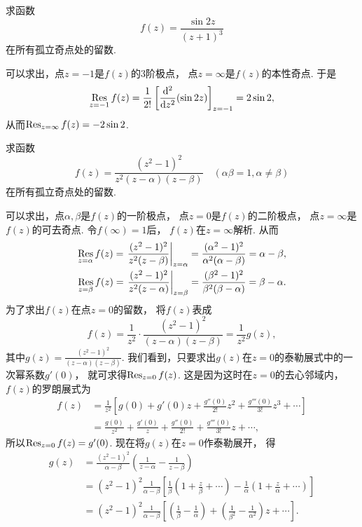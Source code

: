 \begin{example}
求函数\begin{equation*}
	f(z) = \frac{\sin 2z}{(z+1)^3}
\end{equation*}在所有孤立奇点处的留数.
\begin{solution}
可以求出，点\(z=-1\)是\(f(z)\)的3阶极点，
点\(z=\infty\)是\(f(z)\)的本性奇点.
于是\begin{equation*}
	\operatorname*{Res}_{z=-1} f(z)
	= \frac{1}{2!} \left[ \dv[2]{z}(\sin 2z) \right]_{z=-1}
	= 2 \sin 2,
\end{equation*}
从而\(\operatorname*{Res}_{z=\infty} f(z) = -2 \sin 2\).
\end{solution}
\end{example}

\begin{example}
求函数\begin{equation*}
	f(z) = \frac{(z^2-1)^2}{z^2(z-\alpha)(z-\beta)}
	\quad(\alpha\beta=1, \alpha\neq\beta)
\end{equation*}在所有孤立奇点处的留数.
\begin{solution}
可以求出，点\(\alpha,\beta\)是\(f(z)\)的一阶极点，
点\(z=0\)是\(f(z)\)的二阶极点，
点\(z=\infty\)是\(f(z)\)的可去奇点.
令\(f(\infty)=1\)后，
\(f(z)\)在\(z=\infty\)解析.
从而\begin{gather*}
	\Res_{z=\alpha} f(z)
	= \eval{ \frac{(z^2-1)^2}{z^2(z-\beta)} }_{z=\alpha}
	= \frac{(\alpha^2-1)^2}{\alpha^2(\alpha-\beta)}
	= \alpha-\beta, \\
	\Res_{z=\beta} f(z)
	= \eval{ \frac{(z^2-1)^2}{z^2(z-\alpha)} }_{z=\beta}
	= \frac{(\beta^2-1)^2}{\beta^2(\beta-\alpha)}
	= \beta-\alpha.
\end{gather*}
为了求出\(f(z)\)在点\(z=0\)的留数，
将\(f(z)\)表成\begin{equation*}
	f(z) = \frac{1}{z^2} \cdot \frac{(z^2-1)^2}{(z-\alpha)(z-\beta)}
	= \frac{1}{z^2} g(z),
\end{equation*}
其中\(g(z) = \frac{(z^2-1)^2}{(z-\alpha)(z-\beta)}\).
我们看到，只要求出\(g(z)\)在\(z=0\)的泰勒展式中的一次幂系数\(g'(0)\)，
就可求得\(\operatorname*{Res}_{z=0} f(z)\).
这是因为这时在\(z=0\)的去心邻域内，
\(f(z)\)的罗朗展式为\begin{align*}
	f(z) &= \frac{1}{z^2}
		\left[
			g(0) + g'(0) z
			+ \frac{g''(0)}{2!} z^2
			+ \frac{g'''(0)}{3!} z^3
			+ \dotsb
		\right] \\
	&= \frac{g(0)}{z^2}
		+ \frac{g'(0)}{z}
		+ \frac{g''(0)}{2!}
		+ \frac{g'''(0)}{3!} z
		+ \dotsb,
\end{align*}
所以\(\operatorname*{Res}_{z=0} f(z) = g'(0)\).
现在将\(g(z)\)在\(z=0\)作泰勒展开，
得\begin{align*}
	g(z) &= \frac{(z^2-1)^2}{\alpha-\beta}
		\left(\frac{1}{z-\alpha}-\frac{1}{z-\beta}\right) \\
	&= (z^2-1)^2 \frac{1}{\alpha-\beta}
		\left[
			\frac{1}{\beta} \left(1+\frac{z}{\beta}+\dotsb\right)
			- \frac{1}{\alpha} \left(1+\frac{z}{\alpha}+\dotsb\right)
		\right] \\
	&= (z^2-1)^2 \frac{1}{\alpha-\beta}
		\left[
			\left(\frac{1}{\beta}-\frac{1}{\alpha}\right)
			+ \left(\frac{1}{\beta^2}-\frac{1}{\alpha^2}\right) z
			+ \dotsb
		\right].
\end{align*}


\end{solution}
\end{example}

